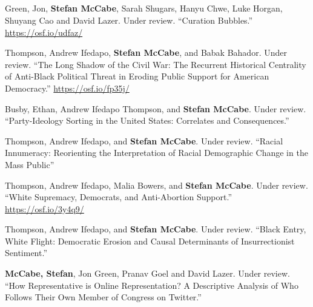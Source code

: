 \documentclass[11pt, letter]{article}
\begin{document}
\subsection*{} %
\vspace{-6mm} %
\begin{hangparas}{.25in}{1}

Green, Jon,\textsuperscript{\textdagger} \textbf{Stefan McCabe},\textsuperscript{\textdagger} Sarah Shugars, Hanyu Chwe, Luke Horgan, Shuyang Cao and David Lazer. Under review. ``Curation Bubbles.'' \href{https://osf.io/udfaz/}{https://osf.io/udfaz/} \vspace{2mm}

Thompson, Andrew Ifedapo, \textbf{Stefan McCabe}, and Babak Bahador. Under review. ``The Long Shadow of the Civil War: The Recurrent Historical Centrality of Anti-Black Political Threat in Eroding Public Support for American Democracy.'' \href{https://osf.io/fp35j/}{https://osf.io/fp35j/} \vspace{2mm}

Busby, Ethan, Andrew Ifedapo Thompson, and \textbf{Stefan McCabe}. Under review. ``Party-Ideology Sorting in the United States: Correlates and Consequences.'' \vspace{2mm}

Thompson, Andrew Ifedapo, and \textbf{Stefan McCabe}. Under review. ``Racial Innumeracy: Reorienting the Interpretation of Racial Demographic Change in the Mass Public''  \vspace{2mm}

Thompson, Andrew Ifedapo, Malia Bowers, and \textbf{Stefan McCabe}. Under review. ``White Supremacy, Democrats, and Anti-Abortion Support.'' \href{https://osf.io/3y4q9/}{https://osf.io/3y4q9/} \vspace{2mm}

Thompson, Andrew Ifedapo, and \textbf{Stefan McCabe}. Under review. ``Black Entry, White Flight: Democratic Erosion and Causal Determinants of Insurrectionist Sentiment.''  \vspace{2mm}



\textbf{McCabe, Stefan}, Jon Green, Pranav Goel and David Lazer. Under review. ``How Representative is Online Representation? A Descriptive Analysis of Who Follows Their Own Member of Congress on Twitter.''\vspace{2mm}


\end{hangparas}
\end{document}
